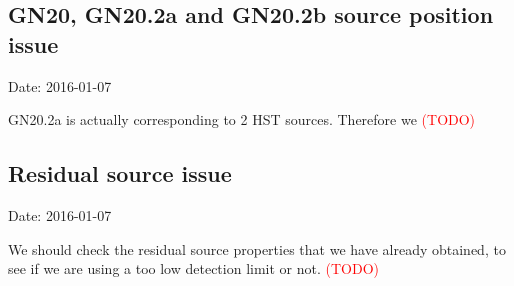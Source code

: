 \documentclass[11pt,a4paper]{article}
\begin{document}
\subsection{GN20, GN20.2a and GN20.2b source position issue}

\textcolor{green!90!black!60!orange}{Date: 2016-01-07}

GN20.2a is actually corresponding to 2 HST sources. Therefore we 
\textcolor{red}{(TODO)}



\subsection{Residual source issue}

\textcolor{green!90!black!60!orange}{Date: 2016-01-07}

We should check the residual source properties that we have already obtained, to see if we are using a too low detection limit or not.  
\textcolor{red}{(TODO)}
\end{document}

